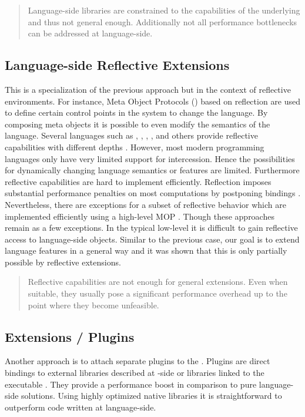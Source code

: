 \begin{quote}
Language-side libraries are constrained to the capabilities of the underlying \VM and thus not general enough. 
Additionally not all performance bottlenecks can be addressed at language-side.
\end{quote}

\subsection{Language-side Reflective Extensions}

This is a specialization of the previous approach but in the context of reflective environments.
For instance, Meta Object Protocols (\MOP) \cite{Kicz91a} based on reflection \cite{Maes87a} are used to define certain control points in the system to change the language.
By composing meta objects it is possible to even modify the semantics of the language. 
Several languages such as \PH, \ST, , , and others provide reflective capabilities with different depths \cite{Ande98a,Van10a}.
However, most modern programming languages only have very limited support for intercession.
Hence the possibilities for dynamically changing language semantics or features are limited. 
Furthermore reflective capabilities are hard to implement efficiently.
Reflection imposes substantial performance penalties on most computations by postponing bindings \cite{Male96a}. 
Nevertheless, there are exceptions for a subset of reflective behavior which are implemented efficiently using a high-level MOP \cite{Vran12a}.
Though these approaches remain as a few exceptions.
In the typical low-level \VM it is difficult to gain reflective access to language-side objects.
Similar to the previous case, our goal is to extend language features in a general way and it was shown that this is only partially possible by reflective extensions. 

\begin{quote}
Reflective capabilities are not enough for general extensions. Even when suitable, they usually pose a significant performance overhead up to the point where they become unfeasible.
\end{quote}

\subsection{\VM Extensions / Plugins}
Another approach is to attach separate plugins to the \VM.
Plugins are direct bindings to external libraries described at \VM-side or libraries linked to the \VM executable \cite[Ch.\ 5]{Blac09a}. 
They provide a performance boost in comparison to pure language-side solutions.
Using highly optimized native libraries it is straightforward to outperform code written at language-side.

